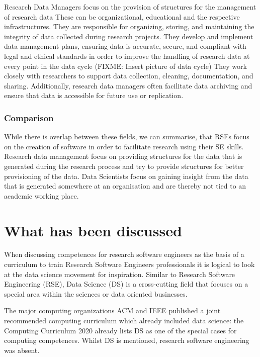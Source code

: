 \documentclass[
        english,biblatex
    ]{lni}
\begin{document}
    Research Data Managers focus on the provision of structures for the
    management of research data These can be organizational, educational
    and the respective infrastructures. They are responsible for
    organizing, storing, and maintaining the integrity of data collected
    during research projects. They develop and implement data management
    plans, ensuring data is accurate, secure, and compliant with legal
    and ethical standards in order to improve the handling of research
    data at every point in the data cycle (FIXME: Insert picture of data
    cycle) They work closely with researchers to support data
    collection, cleaning, documentation, and sharing. Additionally,
    research data managers often facilitate data archiving and ensure
    that data is accessible for future use or replication.

    \subsubsection{Comparison}\label{comparison}

    While there is overlap between these fields, we can summarise, that
    RSEs focus on the creation of software in order to facilitate
    research using their SE skills. Research data management focus on
    providing structures for the data that is generated during the
    research process and try to provide structures for better
    provisioning of the data. Data Scientists focus on gaining insight
    from the data that is generated somewhere at an organisation and are
    thereby not tied to an academic working place.

    \section{What has been discussed}\label{what-has-been-discussed}

    When discussing competences for research software engineers as the
    basis of a curriculum to train Research Software Engineers
    professionals it is logical to look at the data science movement for
    inspiration. Similar to Research Software Engineering (RSE), Data
    Science (DS) is a cross-cutting field that focuses on a special area
    within the sciences or data oriented businesses.

    The major computing organizations ACM and IEEE published a joint
    recommended computing curriculum which already included data
    science: the Computing Curriculum 2020 \autocite{CC2020} already
    lists DS as one of the special cases for computing competences.
    Whilst DS is mentioned, research software engineering was absent.
\end{document}
